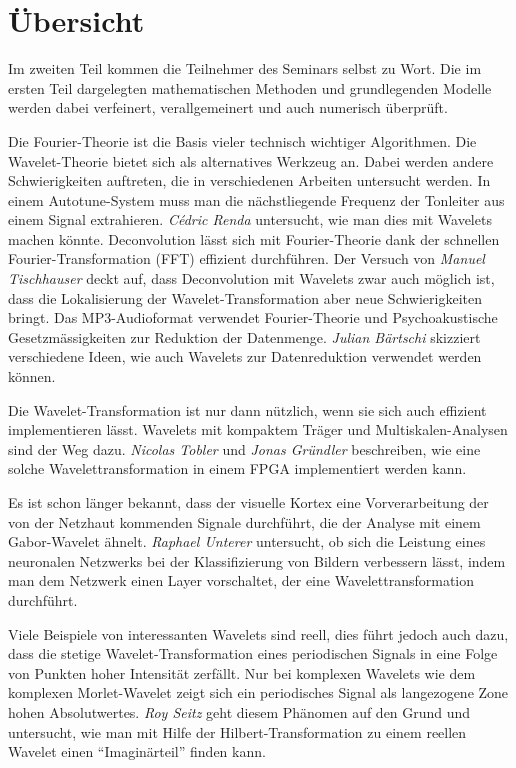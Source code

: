 %
%
%
\chapter*{Übersicht}
\rhead{}
\label{buch:uebersicht}
Im zweiten Teil kommen die Teilnehmer des Seminars selbst zu Wort.
Die im ersten Teil dargelegten mathematischen Methoden und
grundlegenden Modelle werden dabei verfeinert, verallgemeinert
und auch numerisch überprüft.

Die Fourier-Theorie ist die Basis vieler technisch wichtiger Algorithmen.
Die Wavelet-Theorie bietet sich als alternatives Werkzeug an.
Dabei werden andere Schwierigkeiten auftreten, die in verschiedenen
Arbeiten untersucht werden.
In einem Autotune-System muss man die nächstliegende Frequenz der
Tonleiter aus einem Signal extrahieren.
{\em Cédric Renda} untersucht, wie man dies mit Wavelets machen könnte.
Deconvolution lässt sich mit Fourier-Theorie dank der schnellen
Fourier-Transformation (FFT) effizient durchführen.
Der Versuch von {\em Manuel Tischhauser} deckt auf, dass Deconvolution
mit Wavelets zwar auch möglich ist, dass die Lokalisierung der
Wavelet-Transformation aber neue Schwierigkeiten bringt.
Das MP3-Audioformat verwendet Fourier-Theorie und Psychoakustische
Gesetzmässigkeiten zur Reduktion der Datenmenge.
{\em Julian Bärtschi} skizziert verschiedene Ideen, wie auch Wavelets
zur Datenreduktion verwendet werden können.

Die Wavelet-Transformation ist nur dann nützlich, wenn sie sich auch
effizient implementieren lässt.
Wavelets mit kompaktem Träger und Multiskalen-Analysen sind der Weg dazu.
{\em Nicolas Tobler} und {\em Jonas Gründler} beschreiben, wie eine
solche Wavelettransformation in einem FPGA implementiert werden kann.

Es ist schon länger bekannt, dass der visuelle Kortex eine Vorverarbeitung
der von der Netzhaut kommenden Signale durchführt, die der Analyse mit
einem Gabor-Wavelet ähnelt.
{\em Raphael Unterer} untersucht, ob sich die Leistung eines neuronalen
Netzwerks bei der Klassifizierung von Bildern verbessern lässt, indem
man dem Netzwerk einen Layer vorschaltet, der eine Wavelettransformation
durchführt.

Viele Beispiele von interessanten Wavelets sind reell, dies führt jedoch
auch dazu, dass die stetige Wavelet-Transformation eines periodischen Signals
in eine Folge von Punkten hoher Intensität zerfällt.
Nur bei komplexen Wavelets wie dem komplexen Morlet-Wavelet zeigt sich 
ein periodisches Signal als langezogene Zone hohen Absolutwertes.
{\em Roy Seitz} geht diesem Phänomen auf den Grund und untersucht,
wie man mit Hilfe der Hilbert-Transformation zu einem reellen Wavelet
einen ``Imaginärteil'' finden kann.

